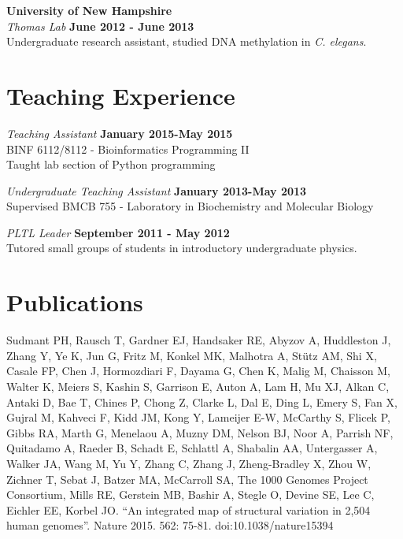 \documentclass[margin,line]{res}
\begin{document}
\begin{resume}
{\bf University of New Hampshire}\\
{\em Thomas Lab} \hfill {\bf June 2012 - June 2013}\\
Undergraduate research assistant, studied DNA methylation in {\em C. elegans}.\\ 


\section{\sc Teaching Experience}

{\em Teaching Assistant} \hfill {\bf January 2015-May 2015}\\
BINF 6112/8112 - Bioinformatics Programming II\\
Taught lab section of Python programming

{\em Undergraduate Teaching Assistant} \hfill {\bf January 2013-May 2013}\\
Supervised BMCB 755 - Laboratory in Biochemistry and Molecular Biology

{\em PLTL Leader} \hfill {\bf September 2011 - May 2012}\\
Tutored small groups of students in introductory undergraduate physics.

\section{\sc Publications}

Sudmant PH, Rausch T, Gardner EJ, Handsaker RE, Abyzov A, Huddleston J, Zhang Y, Ye K, Jun G, Fritz M, Konkel MK, Malhotra A, Stütz AM, Shi X, Casale FP, Chen J, Hormozdiari F, Dayama G, Chen K, Malig M, Chaisson M, Walter K, Meiers S, Kashin S, Garrison E, Auton A, Lam H, Mu XJ, Alkan C, Antaki D, Bae T, Chines P, Chong Z, Clarke L, Dal E, Ding L, Emery S, Fan X, Gujral M, Kahveci F, Kidd JM, Kong Y, Lameijer E-W, McCarthy S, Flicek P, Gibbs RA, Marth G, Menelaou A, Muzny DM, Nelson BJ, Noor A, Parrish NF, Quitadamo A, Raeder B, Schadt E, Schlattl A, Shabalin AA, Untergasser A, Walker JA, Wang M, Yu Y, Zhang C, Zhang J, Zheng-Bradley X, Zhou W, Zichner T, Sebat J, Batzer MA, McCarroll SA, The 1000 Genomes Project Consortium, Mills RE, Gerstein MB, Bashir A, Stegle O, Devine SE, Lee C, Eichler EE, Korbel JO. “An integrated map of structural variation in 2,504 human genomes”. Nature 2015. 562: 75-81. doi:10.1038/nature15394


\end{resume}
\end{document}
